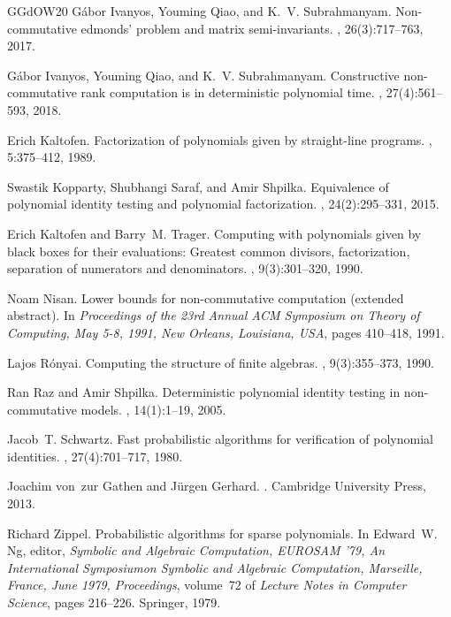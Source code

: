 \documentclass[10pt,a4paper]{article}
\begin{document}
\begin{thebibliography}{GGdOW20}
G{\'{a}}bor Ivanyos, Youming Qiao, and K.~V. Subrahmanyam.
\newblock Non-commutative edmonds' problem and matrix semi-invariants.
, 26(3):717--763, 2017.

G{\'{a}}bor Ivanyos, Youming Qiao, and K.~V. Subrahmanyam.
\newblock Constructive non-commutative rank computation is in deterministic
  polynomial time.
, 27(4):561--593, 2018.

Erich Kaltofen.
\newblock Factorization of polynomials given by straight-line programs.
, 5:375--412, 1989.

Swastik Kopparty, Shubhangi Saraf, and Amir Shpilka.
\newblock Equivalence of polynomial identity testing and polynomial
  factorization.
, 24(2):295--331, 2015.

Erich Kaltofen and Barry~M. Trager.
\newblock Computing with polynomials given by black boxes for their
  evaluations: Greatest common divisors, factorization, separation of
  numerators and denominators.
, 9(3):301--320, 1990.

Noam Nisan.
\newblock Lower bounds for non-commutative computation (extended abstract).
\newblock In {\em Proceedings of the 23rd Annual {ACM} Symposium on Theory of
  Computing, May 5-8, 1991, New Orleans, Louisiana, {USA}}, pages 410--418,
  1991.

Lajos R{\'{o}}nyai.
\newblock Computing the structure of finite algebras.
, 9(3):355--373, 1990.

Ran Raz and Amir Shpilka.
\newblock Deterministic polynomial identity testing in non-commutative models.
, 14(1):1--19, 2005.

Jacob~T. Schwartz.
\newblock Fast probabilistic algorithms for verification of polynomial
  identities.
, 27(4):701--717, 1980.

Joachim von~zur Gathen and J{\"{u}}rgen Gerhard.
.
\newblock Cambridge University Press, 2013.

Richard Zippel.
\newblock Probabilistic algorithms for sparse polynomials.
\newblock In Edward~W. Ng, editor, {\em Symbolic and Algebraic Computation,
  {EUROSAM} '79, An International Symposiumon Symbolic and Algebraic
  Computation, Marseille, France, June 1979, Proceedings}, volume~72 of {\em
  Lecture Notes in Computer Science}, pages 216--226. Springer, 1979.

\end{thebibliography}
\end{document}
